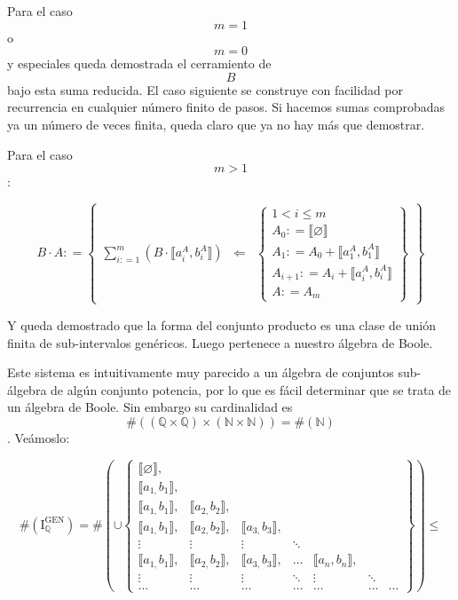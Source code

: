 \documentclass[
]{article}
\begin{document}
\begin{enumerate}
  Para el caso \[m = 1\] o \[m = 0\] y especiales queda demostrada el
  cerramiento de \[B\]bajo esta suma reducida. El caso siguiente se
  construye con facilidad por recurrencia en cualquier número finito de
  pasos. Si hacemos sumas comprobadas ya un número de veces finita,
  queda claro que ya no hay más que demostrar.

  Para el caso \[m > 1\]:

  \[{{B \cdot A}{: =}}\begin{Bmatrix}
  {\sum\limits_{i{: = 1}}^{m}\left( {B \cdot {⟦{a_{i}^{A},b_{i}^{A}}⟧}} \right)} & \Leftarrow & \begin{Bmatrix}
  {{1 < i} \leq m} \\
  {A_{0}{: = {⟦\varnothing ⟧}}} \\
  {A_{1}{: = {A_{0} + {⟦{a_{1}^{A},b_{1}^{A}}⟧}}}} \\
  {A_{i + 1}{: = {A_{i} + {⟦{a_{i}^{A},b_{i}^{A}}⟧}}}} \\
  {A{: = A_{m}}}
  \end{Bmatrix}
  \end{Bmatrix}\]

  Y queda demostrado que la forma del conjunto producto es una clase de
  unión finita de sub-intervalos genéricos. Luego pertenece a nuestro
  álgebra de Boole.

  Este sistema es intuitivamente muy parecido a un álgebra de conjuntos
  sub-álgebra de algún conjunto po\-tencia, por lo que es fácil
  determinar que se trata de un álgebra de Boole. Sin embargo su
  cardinalidad es
  \[\#{\left( {\left( {\mathbb{Q} \times \mathbb{Q}} \right) \times \left( {\mathbb{N} \times \mathbb{N}} \right)} \right) = \#}\left( \mathbb{N} \right)\].
  Veámoslo:

  \[{{\#\left( \mathbf{\mathrm{I}}_{\mathbb{Q}}^{\mathbf{\mathrm{GEN}}} \right)} = {\#\left( {\mathbf{\mathrm{\cup}}\begin{Bmatrix}
  {{⟦\varnothing ⟧},} & & & & & & \\
  {{⟦{a_{1,}b_{1}}⟧},} & & & & & & \\
  {{⟦{a_{1,}b_{1}}⟧},} & {{⟦{a_{2,}b_{2}}⟧},} & & & & & \\
  {{⟦{a_{1,}b_{1}}⟧},} & {{⟦{a_{2,}b_{2}}⟧},} & {{⟦{a_{3,}b_{3}}⟧},} & & & & \\
   \vdots & \vdots & \vdots & \ddots & & & \\
  {{⟦{a_{1,}b_{1}}⟧},} & {{⟦{a_{2,}b_{2}}⟧},} & {{⟦{a_{3,}b_{3}}⟧},} & \ldots & {{⟦{a_{n},b_{n}}⟧},} & & \\
   \vdots & \vdots & \vdots & \ddots & \vdots & \ddots & \\
  \ldots & \ldots & \ldots & \ldots & \ldots & \ldots & \ldots
  \end{Bmatrix}} \right)}} \leq\]


\end{enumerate}
\end{document}
